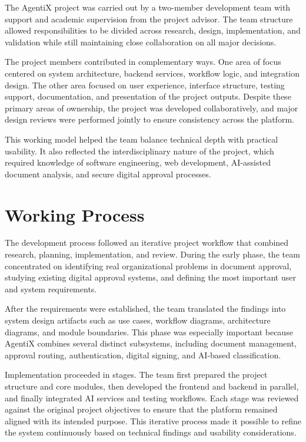 \documentclass[12pt,oneside,openright,a4paper]{cpe-english-project}
\begin{document}
The AgentiX project was carried out by a two-member development team with support and academic supervision from the project advisor. The team structure allowed responsibilities to be divided across research, design, implementation, and validation while still maintaining close collaboration on all major decisions.

The project members contributed in complementary ways. One area of focus centered on system architecture, backend services, workflow logic, and integration design. The other area focused on user experience, interface structure, testing support, documentation, and presentation of the project outputs. Despite these primary areas of ownership, the project was developed collaboratively, and major design reviews were performed jointly to ensure consistency across the platform.

This working model helped the team balance technical depth with practical usability. It also reflected the interdisciplinary nature of the project, which required knowledge of software engineering, web development, AI-assisted document analysis, and secure digital approval processes.

\section{Working Process}

The development process followed an iterative project workflow that combined research, planning, implementation, and review. During the early phase, the team concentrated on identifying real organizational problems in document approval, studying existing digital approval systems, and defining the most important user and system requirements.

After the requirements were established, the team translated the findings into system design artifacts such as use cases, workflow diagrams, architecture diagrams, and module boundaries. This phase was especially important because AgentiX combines several distinct subsystems, including document management, approval routing, authentication, digital signing, and AI-based classification.

Implementation proceeded in stages. The team first prepared the project structure and core modules, then developed the frontend and backend in parallel, and finally integrated AI services and testing workflows. Each stage was reviewed against the original project objectives to ensure that the platform remained aligned with its intended purpose. This iterative process made it possible to refine the system continuously based on technical findings and usability considerations.
\end{document}
